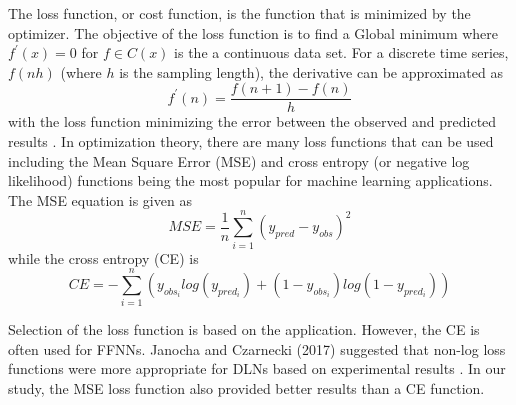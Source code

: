 \documentclass[preprint,12pt,authoryear]{elsarticle}
\begin{document}
\begin{linenumbers}
The loss function, or cost function, is the function that is minimized by the optimizer. The objective of the loss function is to find a Global minimum where $f^{'}(x) = 0$ for $f \in C(x)$ is the a continuous data set. For a discrete time series, $f(nh)$ (where $h$ is the sampling length), the derivative can be approximated as
%
\begin{equation}
\label{eq:discretediff}
f^{'}(n) = \frac{f(n+1) - f(n)}{h} 
\end{equation}
%
with the loss function minimizing the error between the observed and predicted  results \citep{Goodfellow2016}. In optimization theory, there are many loss functions that can be used including the Mean Square Error (MSE) and cross entropy (or negative log likelihood) functions being the most popular for machine learning applications.  The MSE equation is given as 
%
\begin{equation}
\label{eq:MSE}
MSE = \frac{1}{n} \sum_{i=1}^{n} \left( y_{pred} - y_{obs} \right)^{2}
\end{equation}
%
while the cross entropy (CE) is 
%
\begin{equation}
\label{eq:N}
CE = - \sum_{i=1}^{n}\left (y_{obs_i}log(y_{pred_i}) + (1-y_{obs_i})log(1-y_{pred_i})  \right )
\end{equation}

Selection of the loss function is based on the application. However, the CE is often used for FFNNs. Janocha and Czarnecki (2017) suggested that non-log loss functions were more appropriate for DLNs based on experimental results \citep{Janocha2017}. In our study, the MSE loss function also provided better results than a CE function.
%

\end{linenumbers}
\end{document}
